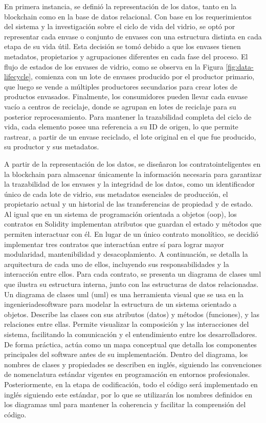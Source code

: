 En primera instancia, se definió la representación de los datos, tanto en la blockchain como en la base de datos relacional. Con base en los requerimientos del sistema y la investigación sobre el ciclo de vida del vidrio, se optó por representar cada envase o conjunto de envases con una estructura distinta en cada etapa de su vida útil. Esta decisión se tomó debido a que los envases tienen metadatos, propietarios y agrupaciones diferentes en cada fase del proceso. El flujo de estados de los envases de vidrio, como se observa en la Figura \ref{fig:data-lifecycle}, comienza con un lote de envases producido por el productor primario, que luego se vende a múltiples productores secundarios para crear lotes de productos envasados. Finalmente, los consumidores pueden llevar cada envase vacío a centros de reciclaje, donde se agrupan en lotes de reciclaje para su posterior reprocesamiento. Para mantener la \gls{trazabilidad} completa del ciclo de vida, cada elemento posee una referencia a su ID de origen, lo que permite rastrear, a partir de un envase reciclado, el lote original en el que fue producido, su productor y sus metadatos.

A partir de la representación de los datos, se diseñaron los \glspl{contratointeligente} en la blockchain para almacenar únicamente la información necesaria para garantizar la trazabilidad de los envases y la integridad de los datos, como un identificador único de cada lote de vidrio, sus metadatos esenciales de producción, el propietario actual y un historial de las transferencias de propiedad y de estado. Al igual que en un sistema de programación orientada a objetos (\acrshort{oop}), los contratos en Solidity implementan atributos que guardan el estado y métodos que permiten interactuar con él. En lugar de un único contrato monolítico, se decidió implementar tres contratos que interactúan entre sí para lograr mayor modularidad, mantenibilidad y desacoplamiento. A continuación, se detalla la arquitectura de cada uno de ellos, incluyendo sus responsabilidades y la interacción entre ellos. Para cada contrato, se presenta un diagrama de clases \acrshort{uml} que ilustra su estructura interna, junto con las estructuras de datos relacionadas. Un diagrama de clases \acrshort{uml} (\acrlong{uml}) es una herramienta visual que se usa en la \gls{ingenieriadesoftware} para modelar la estructura de un sistema orientado a objetos. Describe las clases con sus atributos (datos) y métodos (funciones), y las relaciones entre ellas. Permite visualizar la composición y las interacciones del sistema, facilitando la comunicación y el entendimiento entre los desarrolladores. De forma práctica, actúa como un mapa conceptual que detalla los componentes principales del software antes de su implementación. Dentro del diagrama, los nombres de clases y propiedades se describen en inglés, siguiendo las convenciones de nomenclatura estándar vigentes en programación en entornos profesionales. Posteriormente, en la etapa de codificación, todo el código será implementado en inglés siguiendo este estándar, por lo que se utilizarán los nombres definidos en los diagramas \acrshort{uml} para mantener la coherencia y facilitar la comprensión del código.

